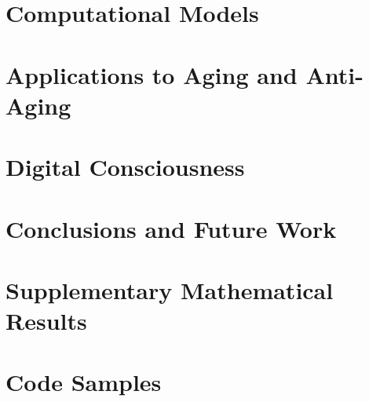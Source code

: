 \documentclass[12pt,a4paper]{report}
\begin{document}
\chapter{Computational Models}
\label{ch:compmodels}

\chapter{Applications to Aging and Anti-Aging}
\label{ch:aging}

\chapter{Digital Consciousness}
\label{ch:consciousness}

\chapter{Conclusions and Future Work}
\label{ch:conclusion}

\appendix

\chapter{Supplementary Mathematical Results}
\label{app:math}

\chapter{Code Samples}
\label{app:code}

\printbibliography
\end{document}
